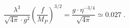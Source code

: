 \begin{equation}
\label{eq:COBEdeccon}
\frac{\lambda^3}{\sqrt{4 \pi} \cdot g^2}
\left(\frac{f}{M_P}\right)^{3/2} =  \frac{g \cdot
\eta^{-3/4}}{\sqrt{4\pi}} \simeq 0.027 \;.  
\end{equation} 
